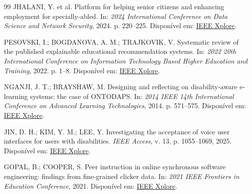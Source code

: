\documentclass[12pt,oneside,a4paper,article]{abntex2}
\begin{document}
\begin{thebibliography}{99}
 JHALANI, Y. et al. Platform for helping senior citizens and enhancing employment for specially-abled. In: \textit{2024 International Conference on Data Science and Network Security}, 2024. p. 220--225. Disponível em: \href{https://ieeexplore.ieee.org/document/10691250}{IEEE Xplore}.

 PESOVSKI, I.; BOGDANOVA, A. M.; TRAJKOVIK, V. Systematic review of the published explainable educational recommendation systems. In: \textit{2022 20th International Conference on Information Technology Based Higher Education and Training}, 2022. p. 1--8. Disponível em: \href{https://ieeexplore.ieee.org/document/10032029}{IEEE Xplore}.

 NGANJI, J. T.; BRAYSHAW, M. Designing and reflecting on disability-aware e-learning systems: the case of ONTODAPS. In: \textit{2014 IEEE 14th International Conference on Advanced Learning Technologies}, 2014. p. 571--575. Disponível em: \href{https://ieeexplore.ieee.org/document/6901543}{IEEE Xplore}.

 JIN, D. H.; KIM, Y. M.; LEE, Y. Investigating the acceptance of voice user interfaces for users with disabilities. \textit{IEEE Access}, v. 13, p. 1055--1069, 2025. Disponível em: \href{https://ieeexplore.ieee.org/document/10807228}{IEEE Xplore}.

 GOPAL, B.; COOPER, S. Peer instruction in online synchronous software engineering: findings from fine-grained clicker data. In: \textit{2021 IEEE Frontiers in Education Conference}, 2021. Disponível em: \href{https://ieeexplore.ieee.org/document/9637353}{IEEE Xplore}.
\end{thebibliography}

\end{document}
